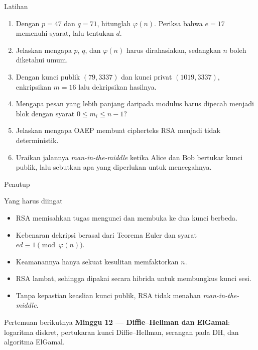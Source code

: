 \documentclass[aspectratio=169,11pt]{beamer}
\begin{document}
\begin{frame}{Latihan}
    \footnotesize
    \begin{enumerate}
        \item Dengan $p = 47$ dan $q = 71$, hitunglah $\varphi(n)$. Periksa
              bahwa $e = 17$ memenuhi syarat, lalu tentukan $d$.
        \item Jelaskan mengapa $p$, $q$, dan $\varphi(n)$ harus dirahasiakan,
              sedangkan $n$ boleh diketahui umum.
        \item Dengan kunci publik $(79,3337)$ dan kunci privat
              $(1019,3337)$, enkripsikan $m = 16$ lalu dekripsikan hasilnya.
        \item Mengapa pesan yang lebih panjang daripada modulus harus
              dipecah menjadi blok dengan syarat $0 \le m_i \le n-1$?
        \item Jelaskan mengapa OAEP membuat cipherteks RSA menjadi tidak
              deterministik.
        \item Uraikan jalannya \textit{man-in-the-middle} ketika Alice dan
              Bob bertukar kunci publik, lalu sebutkan apa yang diperlukan
              untuk mencegahnya.
    \end{enumerate}
\end{frame}

\begin{frame}{Penutup}
    \begin{block}{Yang harus diingat}
        \footnotesize
        \begin{itemize}
            \item RSA memisahkan tugas mengunci dan membuka ke dua kunci
                  berbeda.
            \item Kebenaran dekripsi berasal dari Teorema Euler dan syarat
                  $ed \equiv 1 \pmod{\varphi(n)}$.
            \item Keamanannya hanya sekuat kesulitan memfaktorkan $n$.
            \item RSA lambat, sehingga dipakai secara hibrida untuk
                  membungkus kunci sesi.
            \item Tanpa kepastian keaslian kunci publik, RSA tidak menahan
                  \textit{man-in-the-middle}.
        \end{itemize}
    \end{block}
    \vspace{0.15cm}
    \begin{exampleblock}{Pertemuan berikutnya}
        \textbf{Minggu 12 --- Diffie--Hellman dan ElGamal}: logaritma
        diskret, pertukaran kunci Diffie--Hellman, serangan pada DH, dan
        algoritma ElGamal.
    \end{exampleblock}
\end{frame}
\end{document}

